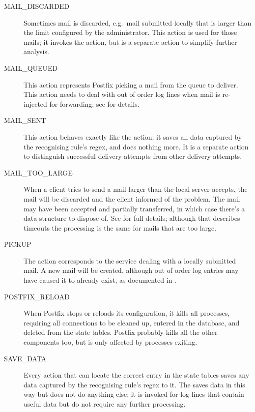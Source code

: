 \begin{description}
    \item [MAIL\_DISCARDED] Sometimes mail is discarded, e.g.\ mail
        submitted locally that is larger than the limit configured by the
        administrator.  This action is used for those mails; it invokes the
         action, but is a separate action to simplify
        further analysis.

    \item [MAIL\_QUEUED] This action represents Postfix picking a mail from
        the queue to deliver.  This action needs to deal with out of order
        log lines when mail is re-injected for forwarding; see
         for details.

    \item [MAIL\_SENT] This action behaves exactly like the
         action; it saves all data captured by the
        recognising rule's regex, and does nothing more.  It is a separate
        action to distinguish successful delivery attempts from other
        delivery attempts.

    \item [MAIL\_TOO\_LARGE] When a client tries to send a mail larger than
        the local server accepts, the mail will be discarded and the client
        informed of the problem.  The mail may have been accepted and
        partially transferred, in which case there's a data structure to
        dispose of.  See  for full
        details; although that describes timeouts the processing is the
        same for mails that are too large.

    \item [PICKUP] The  action corresponds to the
         service dealing with a locally submitted mail.  A
        new mail will be created, although out of order log entries may
        have caused it to already exist, as documented in
        .

    \item [POSTFIX\_RELOAD] When Postfix stops or reloads its
        configuration, it kills all  processes, requiring all
        connections to be cleaned up, entered in the database, and deleted
        from the state tables.  Postfix probably kills all the other
        components too, but \parsername{} is only affected by
         processes exiting.

    \item [SAVE\_DATA] Every action that can locate the correct entry in
        the state tables saves any data captured by the recognising rule's
        regex to it.  The  saves data in this way but
        does not do anything else; it is invoked for log lines that contain
        useful data but do not require any further processing.


\end{description}
